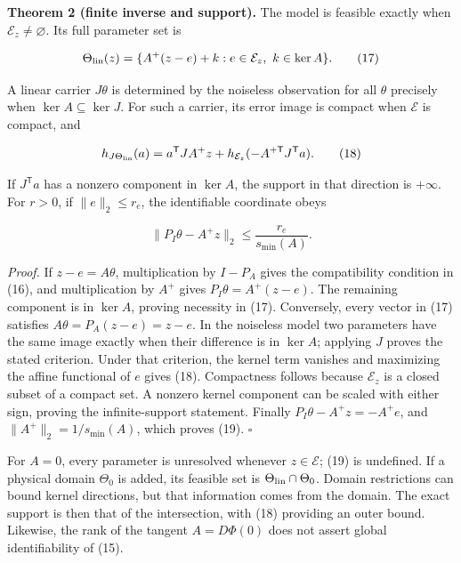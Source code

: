 \documentclass[aps,prd,reprint,onecolumn,11pt,nofootinbib,notitlepage]{revtex4-2}
\begin{document}
\textbf{Theorem 2 (finite inverse and support).} The model is feasible exactly when \(\mathcal E_z\ne\varnothing\). Its full parameter set is

\begin{equation}
 \Theta_{\rm lin}(z)=
 \{A^+(z-e)+k:e\in\mathcal E_z,\ k\in\ker A\}.\tag{17}
\end{equation}

A linear carrier \(J\theta\) is determined by the noiseless observation for all \(\theta\) precisely when \(\ker A\subseteq\ker J\). For such a carrier, its error image is compact when \(\mathcal E\) is compact, and

\begin{equation}
 h_{J\Theta_{\rm lin}}(a)
 =a^{\mathsf T}JA^+z+
 h_{\mathcal E_z}(-A^{+\mathsf T}J^{\mathsf T}a).\tag{18}
\end{equation}

If \(J^{\mathsf T}a\) has a nonzero component in \(\ker A\), the support in that direction is \(+\infty\). For \(r>0\), if \(\|e\|_2\le r_e\), the identifiable coordinate obeys

\begin{equation}
 \|P_I\theta-A^+z\|_2\le\frac{r_e}{s_{\min}(A)} .\tag{19}
\end{equation}

\textit{Proof.} If \(z-e=A\theta\), multiplication by \(I-P_A\) gives the compatibility condition in (16), and multiplication by \(A^+\) gives \(P_I\theta=A^+(z-e)\). The remaining component is in \(\ker A\), proving necessity in (17). Conversely, every vector in (17) satisfies \(A\theta=P_A(z-e)=z-e\). In the noiseless model two parameters have the same image exactly when their difference is in \(\ker A\); applying \(J\) proves the stated criterion. Under that criterion, the kernel term vanishes and maximizing the affine functional of \(e\) gives (18). Compactness follows because \(\mathcal E_z\) is a closed subset of a compact set. A nonzero kernel component can be scaled with either sign, proving the infinite-support statement. Finally \(P_I\theta-A^+z=-A^+e\), and \(\|A^+\|_2=1/s_{\min}(A)\), which proves (19). \(\square\)

For \(A=0\), every parameter is unresolved whenever \(z\in\mathcal E\); (19) is undefined. If a physical domain \(\Theta_0\) is added, its feasible set is \(\Theta_{\rm lin}\cap\Theta_0\). Domain restrictions can bound kernel directions, but that information comes from the domain. The exact support is then that of the intersection, with (18) providing an outer bound. Likewise, the rank of the tangent \(A=D\Phi(0)\) does not assert global identifiability of (15).
\end{document}
